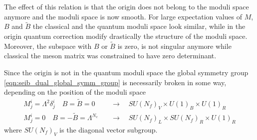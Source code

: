 The effect of this relation is that the origin  does not belong to the moduli space anymore and the moduli space is now smooth.
For large expectation values of $M$, $B$ and $\tilde{B}$ the classical and the quantum moduli space look similar, while in the origin quantum correction modify drastically the structure of the moduli space.
Moreover, the subspace with $B$ or $\tilde{B}$ is zero, is not singular anymore while classical the meson matrix was constrained to have zero determinant. 

Since the origin is not in the quantum moduli space the global symmetry group \eqref{eqn:seib_dual_global_symm_group} is necessarily broken in some way, depending on the position of the moduli space 
\begin{align}
M^i_j = \Lambda^2 \delta^i_j \quad B=\tilde{B}= 0 \quad & \rightarrow  \quad SU(N_f)_V \times U(1)_B \times U(1)_R\\
M^i_j = 0 \quad B=-\tilde{B}= \Lambda^{N_c} \quad & \rightarrow  \quad SU(N_f)_L \times SU(N_f)_R \times U(1)_R
\end{align}
where $SU(N_f)_V$ is the diagonal vector subgroup.


